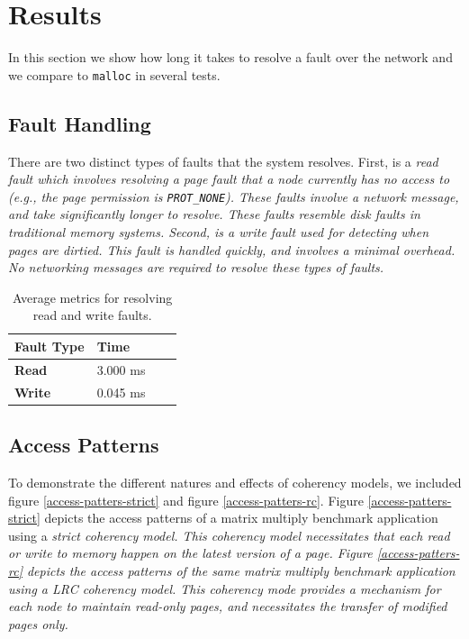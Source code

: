 \section{Results}

In this section we show how long it takes to resolve a fault over the network and we compare \projname{} to \verb,malloc, in several tests.

\subsection{Fault Handling}

There are two distinct types of faults that the \projname{} system resolves.  First, is a \em read \em fault which involves resolving a page fault that a node currently has no access to (e.g., the page permission is \verb,PROT_NONE,).  These faults involve a network message, and take significantly longer to resolve.  These faults resemble disk faults in traditional memory systems.  Second, is a \em write \em fault used for detecting when pages are dirtied.  This fault is handled quickly, and involves a minimal overhead.  No networking messages are required to resolve these types of faults.

\begin{table}[htb]
\centering
\begin{tabular}{|l | l | l | l |}
\hline
\bf{Fault Type} & \bf{Time} \\
\hline
\bf{Read} & 3.000 ms\\
\bf{Write} & 0.045 ms\\
\hline
\end{tabular}
\caption{Average metrics for resolving read and write faults.}
\end{table}

\subsection{Access Patterns}

To demonstrate the different natures and effects of coherency models, we included figure \ref{access-patters-strict} and figure \ref{access-patters-rc}.  Figure \ref{access-patters-strict} depicts the access patterns of a matrix multiply benchmark application using a \em strict \em coherency model.  This coherency model necessitates that each read or write to memory happen on the latest version of a page.  Figure \ref{access-patters-rc} depicts the access patterns of the same matrix multiply benchmark application using a \em LRC \em coherency model.  This coherency mode provides a mechanism for each node to maintain read-only pages, and necessitates the transfer of modified pages only.

